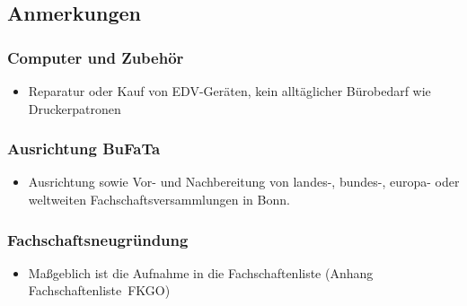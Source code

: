 \documentclass{article}
\begin{document}
    \subsection{Anmerkungen}
        \subsubsection{Computer und Zubehör}
            \begin{itemize}
                \item  Reparatur oder Kauf von EDV-Geräten, kein alltäglicher Bürobedarf wie Druckerpatronen
            \end{itemize}
        \subsubsection{Ausrichtung BuFaTa}
            \begin{itemize}
                \item  Ausrichtung sowie Vor- und Nachbereitung von landes-, bundes-, europa- oder weltweiten Fachschaftsversammlungen in Bonn.
            \end{itemize}
        \subsubsection{Fachschaftsneugründung}
            \begin{itemize}
                \item Maßgeblich ist die Aufnahme in die Fachschaftenliste (Anhang \glqq Fachschaftenliste\grqq\ FKGO)
            \end{itemize}

\pagebreak
\end{document}

